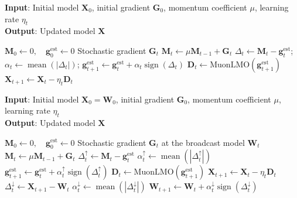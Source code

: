 \documentclass[letterpaper]{article} %
\begin{document}
\begin{algorithm}[!t]
\caption{Centralized EF21-MuonUSign}
\label{central_alg_ef}
\textbf{Input}: Initial model $\mathbf{X}_0$, initial gradient $\mathbf{G}_0$, momentum coefficient $\mu$, learning rate $\eta_t$ \\
\textbf{Output}: Updated model $\mathbf{X}$
\begin{algorithmic}[1]
\State $\mathbf{M}_0 \gets 0,\quad \mathbf{g}_0^{\mathrm{est}} \gets 0$
  \State Stochastic gradient $\mathbf{G}_t$
  \State $\mathbf{M}_t \gets \mu\mathbf{M}_{t-1} + \mathbf{G}_t$
  \State $\Delta_t \gets \mathbf{M}_t - \mathbf{g}_t^{\mathrm{est}}$;
  \quad $\alpha_t \gets \operatorname{mean}(|\Delta_t|)$;
  \State $\mathbf{g}_{t+1}^{\mathrm{est}} \gets \mathbf{g}_t^{\mathrm{est}} + \alpha_t\operatorname{sign}(\Delta_t)$
  \State $\mathbf{D}_t \gets \mathrm{MuonLMO}(\mathbf{g}_{t+1}^{\mathrm{est}})$
  \State $\mathbf{X}_{t+1} \gets \mathbf{X}_t - \eta_t\mathbf{D}_t$
\EndFor
\end{algorithmic}
\end{algorithm}

\begin{algorithm}[!t]
\caption{Centralized EF21-MuonUDSign (bidirectional)}
\label{central_alg_ud}
\textbf{Input}: Initial model $\mathbf{X}_0=\mathbf{W}_0$,  initial gradient $\mathbf{G}_0$, momentum coefficient $\mu$, learning rate $\eta_t$ \\
\textbf{Output}: Updated model $\mathbf{X}$
\begin{algorithmic}[1]
\State $\mathbf{M}_0 \gets 0,\quad \mathbf{g}_0^{\mathrm{est}} \gets 0$
\State Stochastic gradient $\mathbf{G}_t$ at the broadcast model $\mathbf{W}_t$
\State $\mathbf{M}_t \gets \mu\mathbf{M}_{t-1} + \mathbf{G}_t$ 
\State $\Delta_t^{\uparrow} \gets \mathbf{M}_t - \mathbf{g}_t^{\mathrm{est}}$
\State $\alpha_t^{\uparrow} \gets
\operatorname{mean}(|\Delta_t^{\uparrow}|)$
\State $\mathbf{g}_{t+1}^{\mathrm{est}} \gets \mathbf{g}_t^{\mathrm{est}} +
\alpha_t^{\uparrow}\operatorname{sign}(\Delta_t^{\uparrow})$
\State $\mathbf{D}_t \gets \mathrm{MuonLMO}(\mathbf{g}_{t+1}^{\mathrm{est}})$ 
\State $\mathbf{X}_{t+1} \gets \mathbf{X}_t - \eta_t\mathbf{D}_t$
\State $\Delta_t^{\downarrow} \gets \mathbf{X}_{t+1} - \mathbf{W}_t$
\State $\alpha_t^{\downarrow} \gets
\operatorname{mean}(|\Delta_t^{\downarrow}|)$
\State $\mathbf{W}_{t+1} \gets \mathbf{W}_t + \alpha_t^{\downarrow}\operatorname{sign}(\Delta_t^{\downarrow})$
\EndFor
\end{algorithmic}
\end{algorithm}
\end{document}
